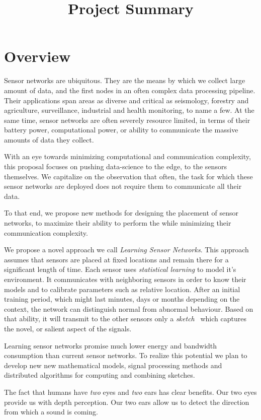 \documentclass{article}
\title{Project Summary}
\begin{document}
\section{Overview}
Sensor networks are ubiquitous. They are the means by which we collect large amount of data, and the first nodes in an often complex data processing pipeline. Their applications span areas as diverse and critical as seismology, forestry and agriculture, surveillance, industrial and health monitoring, to name a few. At the same time, sensor networks are often severely resource limited, in terms of their battery power, computational power, or ability to communicate the massive amounts of data they collect.

With an eye towards minimizing computational and communication complexity, this proposal focuses on pushing data-science to the edge, to the sensors themselves. We capitalize on the observation that often, the task for which these sensor networks are deployed does not require them to communicate all their data. 

To that end, we propose new methods for designing the placement of sensor networks, to maximize their ability to perform the  while minimizing their communication complexity. 




We propose a novel approach we call {\em Learning Sensor Networks}.
This approach assumes that sensors are placed at fixed locations and
remain there for a significant length of time.  Each sensor uses {\em
  statistical learning} to model it's environment. It communicates
with neighboring sensors in order to know their models and to
calibrate parameters such as relative location. After an initial
training period, which might last minutes, days or months depending on
the context, the network can distinguish normal from abnormal
behaviour. Based on that ability, it will transmit to the other
sensors only a {\em sketch}~\cite{} which captures the novel, or
salient aspect of the signals.

Learning sensor networks promise much lower energy and bandwidth
consumption than current sensor networks. To realize this potential we
plan to develop new new mathematical models, signal processing methods
and distributed algorithms for computing and combining sketches.


\iffalse The fact that humans have {\em two} eyes and {\em two} ears has clear
benefits. Our two eyes provide us with depth perception. Our two ears
allow us to detect the direction from which a sound is coming.
\end{document}
